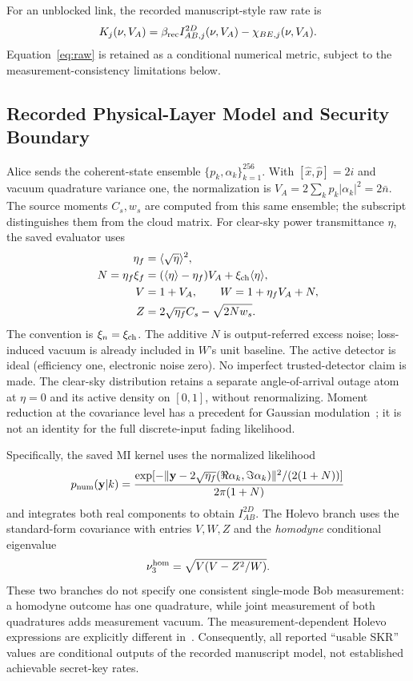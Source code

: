 \documentclass[conference,a4paper]{IEEEtran}
\begin{document}
For an unblocked link, the recorded manuscript-style raw rate is
\begin{equation}
 K_j(\nu,V_A)=\beta_{\rm rec}I_{AB,j}^{2D}(\nu,V_A)-\chi_{BE,j}(\nu,V_A).
 \label{eq:raw}
\end{equation}
Equation~\eqref{eq:raw} is retained as a conditional numerical metric,
subject to the measurement-consistency limitations below.

\subsection{Recorded Physical-Layer Model and Security Boundary}
\label{sec:security}
Alice sends the coherent-state ensemble $\{p_k,\alpha_k\}_{k=1}^{256}$.
With $[\hat x,\hat p]=2i$ and vacuum quadrature variance one, the
normalization is $V_A=2\sum_kp_k|\alpha_k|^2=2\bar n$.
The source moments $C_s,w_s$ are computed from this same ensemble;
the subscript distinguishes them from the cloud matrix.
For clear-sky power transmittance $\eta$, the saved evaluator uses
\begin{align*}
 \eta_f&=\langle\sqrt\eta\rangle^2,\\
 N=\eta_f\xi_f&=(\langle\eta\rangle-\eta_f)V_A
                  +\xi_{\rm ch}\langle\eta\rangle,\\
 V&=1+V_A,\qquad W=1+\eta_fV_A+N,\\
 Z&=2\sqrt{\eta_f}C_s-\sqrt{2Nw_s}.
\end{align*}
The convention is $\xi_n=\xi_{\rm ch}$. The additive $N$ is
output-referred excess noise; loss-induced vacuum is already included
in $W$'s unit baseline. The active detector is ideal (efficiency one,
electronic noise zero). No imperfect trusted-detector claim is made.
The clear-sky distribution retains a separate angle-of-arrival outage
atom at $\eta=0$ and its active density on $[0,1]$, without renormalizing.
Moment reduction at the covariance level has a precedent for Gaussian
modulation~\cite{usenko2012}; it is not an identity for the full
discrete-input fading likelihood.

Specifically, the saved MI kernel uses the normalized likelihood
\[
 p_{\rm num}(\mathbf y|k)=\frac{
 \exp[-\|\mathbf y-2\sqrt{\eta_f}(\Re\alpha_k,\Im\alpha_k)\|^2/
                 (2(1+N))]}{2\pi(1+N)}
\]
and integrates both real components to obtain $I_{AB}^{2D}$.
The Holevo branch uses the standard-form covariance with entries
$V,W,Z$ and the \emph{homodyne} conditional eigenvalue
\[
 \nu_3^{\rm hom}=\sqrt{V(V-Z^2/W)}.
\]
These two branches do not specify one consistent single-mode Bob
measurement: a homodyne outcome has one quadrature, while joint
measurement of both quadratures adds measurement vacuum. The
measurement-dependent Holevo expressions are explicitly different
in~\cite{denys2021}. Consequently, all reported ``usable SKR'' values
are conditional outputs of the recorded manuscript model, not
established achievable secret-key rates.
\end{document}
